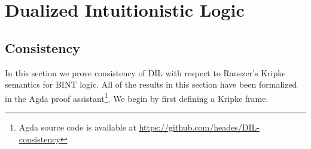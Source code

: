 \section{Dualized Intuitionistic Logic}
\label{sec:dualized_intuitionistic_logic}

\subsection{Consistency}
\label{subsec:consistency_dil}
In this section we prove consistency of DIL with respect to Rauszer's
Kripke semantics for BINT logic.  All of the results in this section
have been formalized in the Agda proof assistant\footnote{Agda source
  code is available at
  \url{https://github.com/heades/DIL-consistency}}.  We begin by first
defining a Kripke frame.

